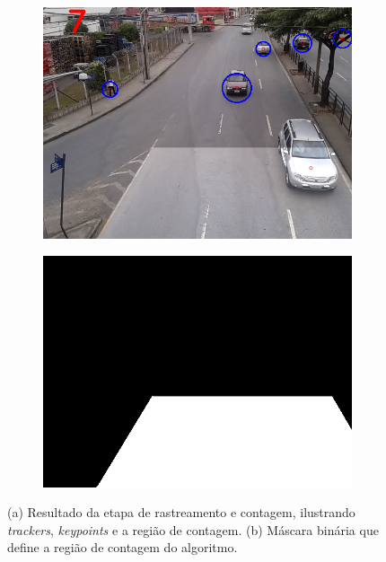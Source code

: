 \begin{figure}[ht]
  \begin{center}
    \begin{subfigure}[b]{.49\textwidth}
      \begin{center}
        \includegraphics[width=1\linewidth]{imgs/trackers.png}
      \end{center}
      \caption{}
      \label{fig:trackers}
    \end{subfigure}
    \begin{subfigure}[b]{.49\textwidth}
      \begin{center}
        \includegraphics[width=1\linewidth]{imgs/bin_mask.png}
      \end{center}
      \caption{}
      \label{fig:bin_mask}
    \end{subfigure}
  \end{center}
  \caption{(a) Resultado da etapa de rastreamento e contagem, ilustrando \textit{trackers}, \textit{keypoints} e a região de contagem. (b) Máscara binária que define a região de contagem do algoritmo.}
  \label{fig:resultado_contagem}
\end{figure}

